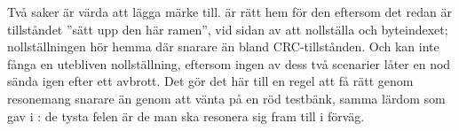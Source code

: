 Två saker är värda att lägga märke till.  är rätt hem för den eftersom det redan är
tillståndet ”sätt upp den här ramen”, vid sidan av att nollställa  och byteindexet;
nollställningen hör hemma där snarare än bland CRC-tillstånden. Och  kan inte
fånga en utebliven nollställning, eftersom ingen av dess två scenarier låter en nod sända igen efter
ett avbrott. Det gör det här till en regel att få rätt genom resonemang snarare än genom att vänta på
en röd testbänk, samma lärdom som  gav i : de tysta felen är
de man ska resonera sig fram till i förväg.
